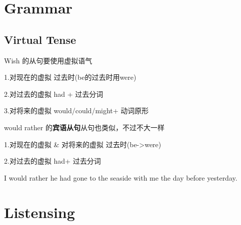 \documentclass[utf8]{ctexart}
\begin{document}
	\section{Grammar}
	\subsection{Virtual Tense}
	\par Wish 的从句要使用虚拟语气
	\par 1.对现在的虚拟 过去时(be的过去时用were)
	\par 2.对过去的虚拟 had + 过去分词
	\par 3.对将来的虚拟 would/could/might+ 动词原形			
	\par would rather 的\textbf{宾语从句}从句也类似，不过不大一样
	\par 1.对现在的虚拟 \& 对将来的虚拟 过去时(be->were)	
	\par 2.对过去的虚拟 had+ 过去分词	
	\par I would rather he had gone to the seaside with me the day before yesterday.	
	\par  


	
	
	\section{Listensing}
	
	

	
	
\end{document}

